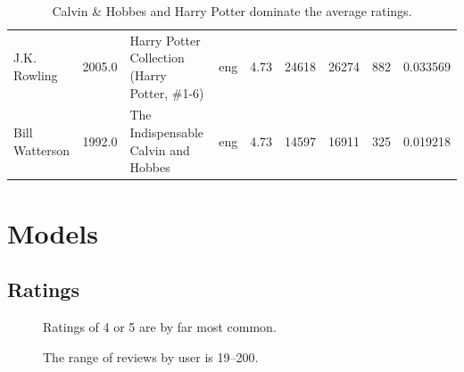 \documentclass[handout]{beamer}
\begin{document}
\begin{frame}
\begin{table}
\begin{tabular}{lHlHHHHHZ}
                               J.K. Rowling &                     2005.0 &       Harry Potter Collection (Harry Potter, \#1-6) &           eng &            4.73 &          24618 &               26274 &                      882 &       0.033569 \\
                             Bill Watterson &                     1992.0 &                The Indispensable Calvin and Hobbes &           eng &            4.73 &          14597 &               16911 &                      325 &       0.019218 \\
\bottomrule
\end{tabular}
    \caption[Most Highly-Rated Books]{Calvin \& Hobbes and Harry Potter dominate the average ratings.}
     \label{tbl:most-highly-rated-books}
\end{table}


\end{frame}




\section{Models}\label{models}


\subsection{Ratings}\label{ratings}


\begin{frame}

\begin{figure}
    \begin{center}
    \end{center}
    \caption[Distribution of User Ratings]{Ratings of 4 or 5 are by far most common.}
     \label{fig:average-rating-reviews-count}
\end{figure}
\end{frame}

\begin{frame}
\begin{figure}

    \begin{center}
    \end{center}
    \caption[Distribution of Ratings by User]{The range of reviews by user is 19--200.}
     \label{fig:ratings-by-user}
     \end{figure}

\end{frame}
\end{document}
